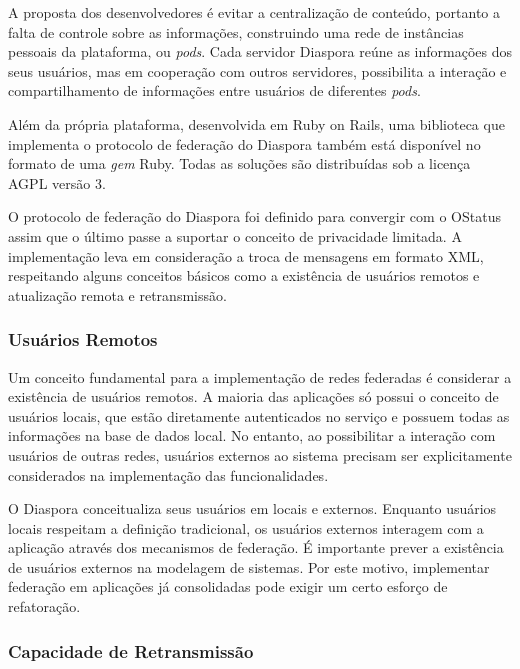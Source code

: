 
A proposta dos desenvolvedores é evitar a centralização de conteúdo, portanto a falta
de controle sobre as informações, construindo uma rede de instâncias pessoais da
plataforma, ou \textit{pods}. Cada servidor Diaspora reúne as informações dos seus
usuários, mas em cooperação com outros servidores, possibilita a interação e
compartilhamento de informações entre usuários de diferentes \textit{pods}.

Além da própria plataforma, desenvolvida em Ruby on Rails, uma biblioteca que
implementa o protocolo de federação do Diaspora também está disponível no formato de
uma \textit{gem} Ruby. Todas as soluções são distribuídas sob a licença AGPL versão
3. 

O protocolo de federação do Diaspora foi definido para convergir com o OStatus assim
que o último passe a suportar o conceito de privacidade limitada. A implementação
leva em consideração a troca de mensagens em formato XML, respeitando alguns
conceitos básicos como a existência de usuários remotos e atualização remota e
retransmissão.

\subsubsection{Usuários Remotos}

Um conceito fundamental para a implementação de redes federadas é considerar a
existência de usuários remotos. A maioria das aplicações só possui o conceito de
usuários locais, que estão diretamente autenticados no serviço e possuem todas as
informações na base de dados local. No entanto, ao possibilitar a interação com
usuários de outras redes, usuários externos ao sistema precisam ser explicitamente
considerados na implementação das funcionalidades.

O Diaspora conceitualiza seus usuários em locais e externos. Enquanto usuários locais
respeitam a definição tradicional, os usuários externos interagem com a aplicação
através dos mecanismos de federação. É importante prever a existência de usuários
externos na modelagem de sistemas. Por este motivo, implementar federação em
aplicações já consolidadas pode exigir um certo esforço de refatoração. %

\subsubsection{Capacidade de Retransmissão}

